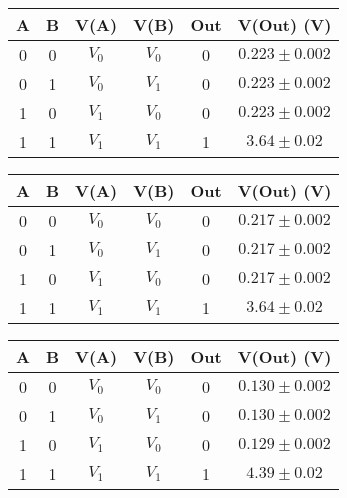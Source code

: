 \begin{table}[H]
  \centering
  \begin{subtable}[H]{0.5\textwidth}
    \centering
    \begin{tabular}[t]{c  c | c  c | c  c}
      \hline
      A & B & V(A) & V(B) & Out & V(Out) (V)\\
      \hline
      0 & 0 & $V_{0}$ & $V_{0}$ & 0 & $0.223 \pm 0.002$ \\
      0 & 1 & $V_{0}$ & $V_{1}$ & 0 & $0.223 \pm 0.002$ \\
      1 & 0 & $V_{1}$ & $V_{0}$ & 0 & $0.223 \pm 0.002$ \\
      1 & 1 & $V_{1}$ & $V_{1}$ & 1 & $3.64 \pm 0.02$ \\
      \hline
    \end{tabular}
  \end{subtable}

  \vspace{.5cm}

  \begin{subtable}[H]{0.5\textwidth}
    \centering
    \begin{tabular}[t]{c  c | c  c | c  c}
      \hline
      A & B & V(A) & V(B) & Out & V(Out) (V)\\
      \hline
      0 & 0 & $V_{0}$ & $V_{0}$ & 0 & $0.217 \pm 0.002$ \\
      0 & 1 & $V_{0}$ & $V_{1}$ & 0 & $0.217 \pm 0.002$ \\
      1 & 0 & $V_{1}$ & $V_{0}$ & 0 & $0.217 \pm 0.002$ \\
      1 & 1 & $V_{1}$ & $V_{1}$ & 1 & $3.64 \pm 0.02$ \\
      \hline
    \end{tabular}
  \end{subtable}

  \vspace{.5mm}

  \begin{subtable}[H]{0.5\textwidth}
    \centering
    \begin{tabular}[t]{c  c | c  c | c  c}
      \hline
      A & B & V(A) & V(B) & Out & V(Out) (V)\\
      \hline
      0 & 0 & $V_{0}$ & $V_{0}$ & 0 & $0.130 \pm 0.002$ \\
      0 & 1 & $V_{0}$ & $V_{1}$ & 0 & $0.130 \pm 0.002$ \\
      1 & 0 & $V_{1}$ & $V_{0}$ & 0 & $0.129 \pm 0.002$ \\
      1 & 1 & $V_{1}$ & $V_{1}$ & 1 & $4.39 \pm 0.02$ \\
      \hline
    \end{tabular}
  \end{subtable}


\end{table}

